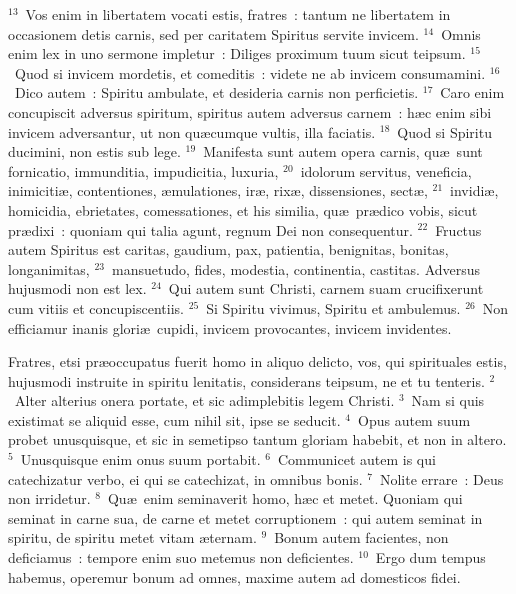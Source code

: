 ${}^{13}$~Vos enim in libertatem vocati estis, fratres~: tantum ne libertatem in occasionem detis carnis, sed per caritatem Spiritus servite invicem.
${}^{14}$~Omnis enim lex in uno sermone impletur~: Diliges proximum tuum sicut teipsum.
${}^{15}$~Quod si invicem mordetis, et comeditis~: videte ne ab invicem consumamini.
${}^{16}$~Dico autem~: Spiritu ambulate, et desideria carnis non perficietis.
${}^{17}$~Caro enim concupiscit adversus spiritum, spiritus autem adversus carnem~: h\ae c enim sibi invicem adversantur, ut non qu\ae cumque vultis, illa faciatis.
${}^{18}$~Quod si Spiritu ducimini, non estis sub lege.
${}^{19}$~Manifesta sunt autem opera carnis, qu\ae\ sunt fornicatio, immunditia, impudicitia, luxuria,
${}^{20}$~idolorum servitus, veneficia, inimiciti\ae , contentiones, \ae mulationes, ir\ae , rix\ae , dissensiones, sect\ae ,
${}^{21}$~invidi\ae , homicidia, ebrietates, comessationes, et his similia, qu\ae\ pr\ae dico vobis, sicut pr\ae dixi~: quoniam qui talia agunt, regnum Dei non consequentur.
${}^{22}$~Fructus autem Spiritus est caritas, gaudium, pax, patientia, benignitas, bonitas, longanimitas,
${}^{23}$~mansuetudo, fides, modestia, continentia, castitas. Adversus hujusmodi non est lex.
${}^{24}$~Qui autem sunt Christi, carnem suam crucifixerunt cum vitiis et concupiscentiis.
${}^{25}$~Si Spiritu vivimus, Spiritu et ambulemus.
${}^{26}$~Non efficiamur inanis glori\ae\ cupidi, invicem provocantes, invicem invidentes.

\lettrine[lines=10,image=true,loversize=0.05,lraise=-0.03]{F}{}ratres, etsi pr\ae occupatus fuerit homo in aliquo delicto, vos, qui spirituales estis, hujusmodi instruite in spiritu lenitatis, considerans teipsum, ne et tu tenteris.
${}^{2}$~Alter alterius onera portate, et sic adimplebitis legem Christi.
${}^{3}$~Nam si quis existimat se aliquid esse, cum nihil sit, ipse se seducit.
${}^{4}$~Opus autem suum probet unusquisque, et sic in semetipso tantum gloriam habebit, et non in altero.
${}^{5}$~Unusquisque enim onus suum portabit.
${}^{6}$~Communicet autem is qui catechizatur verbo, ei qui se catechizat, in omnibus bonis.
${}^{7}$~Nolite errare~: Deus non irridetur.
${}^{8}$~Qu\ae\ enim seminaverit homo, h\ae c et metet. Quoniam qui seminat in carne sua, de carne et metet corruptionem~: qui autem seminat in spiritu, de spiritu metet vitam \ae ternam.
${}^{9}$~Bonum autem facientes, non deficiamus~: tempore enim suo metemus non deficientes.
${}^{10}$~Ergo dum tempus habemus, operemur bonum ad omnes, maxime autem ad domesticos fidei.


